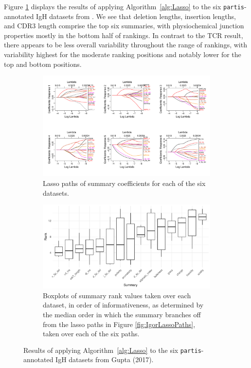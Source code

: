 \documentclass{article}
\newcommand{\partis}{\texttt{partis}}
\begin{document}
Figure \ref{fig:PartisLasso} displays the results of applying Algorithm~\ref{alg:Lasso} to the six \partis-annotated IgH datasets from \cite{Gupta2017-ve}.
We see that deletion lengths, insertion lengths, and CDR3 length comprise the top six summaries, with physiochemical junction properties mostly in the bottom half of rankings.
In contrast to the TCR result, there appears to be less overall variability throughout the range of rankings, with variability highest for the moderate ranking positions and notably lower for the top and bottom positions.

\begin{figure}
    \begin{subfigure}{\linewidth}
    	\includegraphics[width=\linewidth]{Figures/Lasso/partis_lasso_paths.pdf}
		\caption{Lasso paths of summary coefficients for each of the six datasets.}
    \end{subfigure}
    \begin{subfigure}{\linewidth}
    	\includegraphics[width=\linewidth]{Figures/Lasso/partis_lasso_scores.pdf}
		\caption{Boxplots of summary rank values taken over each dataset, in order of informativeness, as determined by the median order in which the summary branches off from the lasso paths in Figure \ref{fig:IgorLassoPaths}, taken over each of the six paths.}
    \end{subfigure}
    \caption{Results of applying Algorithm~\ref{alg:Lasso} to the six \partis-annotated IgH datasets from Gupta (2017).}
    \label{fig:PartisLasso}
\end{figure}
\end{document}
